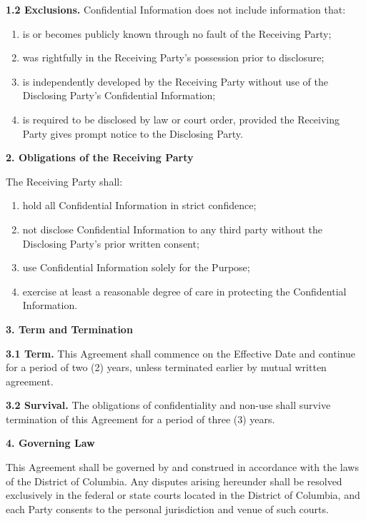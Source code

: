 \documentclass[11pt,letterpaper]{article}
\begin{document}
\noindent \textbf{1.2 Exclusions.} Confidential Information does not include
information that:
\begin{enumerate}
  \item is or becomes publicly known through no fault of the Receiving Party;
  \item was rightfully in the Receiving Party's possession prior to disclosure;
  \item is independently developed by the Receiving Party without use of the
        Disclosing Party's Confidential Information;
  \item is required to be disclosed by law or court order, provided the
        Receiving Party gives prompt notice to the Disclosing Party.
\end{enumerate}

\vspace{0.3cm}
\noindent \textcolor{DarkNavy}{\large \textbf{2. Obligations of the Receiving Party}}

\noindent The Receiving Party shall:
\begin{enumerate}
  \item hold all Confidential Information in strict confidence;
  \item not disclose Confidential Information to any third party without the
        Disclosing Party's prior written consent;
  \item use Confidential Information solely for the Purpose;
  \item exercise at least a reasonable degree of care in protecting the
        Confidential Information.
\end{enumerate}

\vspace{0.3cm}
\noindent \textcolor{DarkNavy}{\large \textbf{3. Term and Termination}}

\noindent \textbf{3.1 Term.} This Agreement shall commence on the Effective
Date and continue for a period of two (2) years, unless terminated earlier by
mutual written agreement.

\noindent \textbf{3.2 Survival.} The obligations of confidentiality and non-use
shall survive termination of this Agreement for a period of three (3) years.

\vspace{0.3cm}
\noindent \textcolor{DarkNavy}{\large \textbf{4. Governing Law}}

\noindent This Agreement shall be governed by and construed in accordance with
the laws of the District of Columbia. Any disputes arising hereunder shall be
resolved exclusively in the federal or state courts located in the District of
Columbia, and each Party consents to the personal jurisdiction and venue of such
courts.
\end{document}
